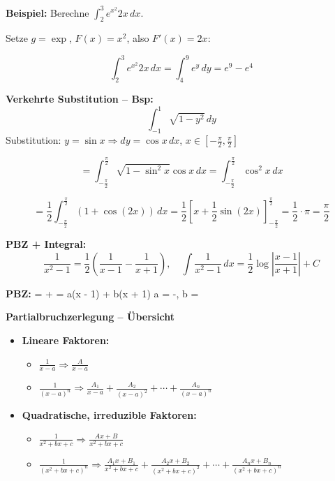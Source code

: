 \begin{itemize}
\textbf{Beispiel:} Berechne $\int_2^3 e^{x^2} 2x \, dx$.

Setze $g = \exp$, $F(x) = x^2$, also $F'(x) = 2x$:

\[
\int_2^3 e^{x^2} 2x\, dx = \int_{4}^{9} e^y\, dy = e^9 - e^4
\]

\textbf{Verkehrte Substitution – Bsp:}
\[
\int_{-1}^{1} \sqrt{1 - y^2} \, dy
\]
Substitution: \( y = \sin x \Rightarrow dy = \cos x \, dx \), \( x \in \left[-\tfrac{\pi}{2}, \tfrac{\pi}{2}\right] \)

\[
= \int_{-\frac{\pi}{2}}^{\frac{\pi}{2}} \sqrt{1 - \sin^2 x} \cos x \, dx = \int_{-\frac{\pi}{2}}^{\frac{\pi}{2}} \cos^2 x \, dx
\]

\[
= \frac{1}{2} \int_{-\frac{\pi}{2}}^{\frac{\pi}{2}} (1 + \cos(2x)) \, dx = \frac{1}{2} \left[ x + \frac{1}{2} \sin(2x) \right]_{-\frac{\pi}{2}}^{\frac{\pi}{2}} = \frac{1}{2} \cdot \pi = \frac{\pi}{2}
\]

\textbf{PBZ + Integral:}  
\[
\frac{1}{x^2 - 1} = \frac{1}{2} \left( \frac{1}{x - 1} - \frac{1}{x + 1} \right), \quad
\int \frac{1}{x^2 - 1} \, dx = \frac{1}{2} \log\left| \frac{x - 1}{x + 1} \right| + C
\]

\textbf{PBZ:} \quad
{} =  +  
 = a(x - 1) + b(x + 1) 
\Rightarrow a = -,\; b = 

\textbf{Partialbruchzerlegung – Übersicht}

\begin{itemize}
  \item \textbf{Lineare Faktoren:}
    \begin{itemize}
      \item \( \frac{1}{x - a} \Rightarrow \frac{A}{x - a} \)
      \item \( \frac{1}{(x - a)^n} \Rightarrow \frac{A_1}{x - a} + \frac{A_2}{(x - a)^2} + \cdots + \frac{A_n}{(x - a)^n} \)
    \end{itemize}
    
  \item \textbf{Quadratische, irreduzible Faktoren:}
    \begin{itemize}
      \item \( \frac{1}{x^2 + bx + c} \Rightarrow \frac{Ax + B}{x^2 + bx + c} \)
      \item \( \frac{1}{(x^2 + bx + c)^n} \Rightarrow \frac{A_1x + B_1}{x^2 + bx + c} + \frac{A_2x + B_2}{(x^2 + bx + c)^2} + \cdots + \frac{A_nx + B_n}{(x^2 + bx + c)^n} \)
    \end{itemize}
\end{itemize}


\end{itemize}
